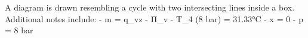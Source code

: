 A diagram is drawn resembling a cycle with two intersecting lines inside a box.  
Additional notes include:  
- m = q_vz  
- Π_v  
- T_4 (8 bar) = 31.33°C  
- x = 0  
- p = 8 bar
